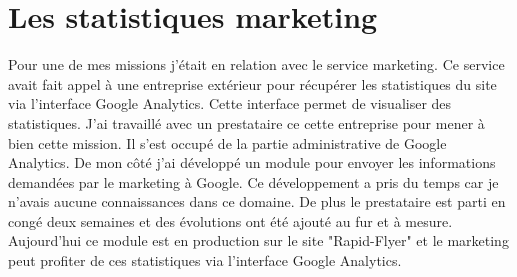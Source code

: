 \section{Les statistiques marketing}
Pour une de mes missions j'était en relation avec le service marketing. Ce service avait fait appel à une entreprise extérieur pour récupérer les statistiques du site via l'interface Google Analytics. Cette interface permet de visualiser des statistiques.\newline
J'ai travaillé avec un prestataire ce cette entreprise pour mener à bien cette mission. Il s'est occupé de la partie administrative de Google Analytics. De mon côté j'ai développé un module pour envoyer les informations demandées par le marketing à Google. Ce développement a pris du temps car je n'avais aucune connaissances dans ce domaine. De plus le prestataire est parti en congé deux semaines et des évolutions ont été ajouté au fur et à mesure. Aujourd'hui ce module est en production sur le site "Rapid-Flyer" et le marketing peut profiter de ces statistiques via l'interface Google Analytics.